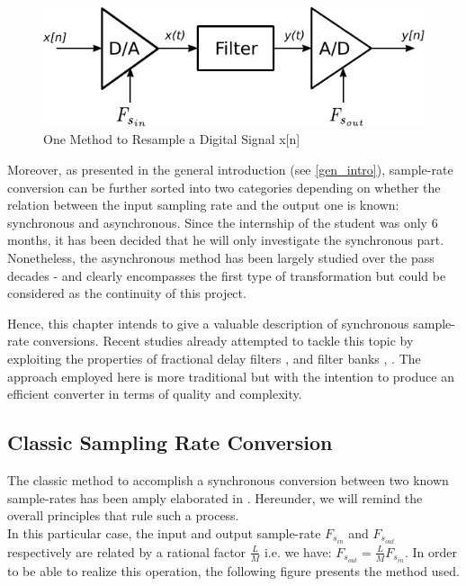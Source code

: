 \begin{figure}[th]
	\centering
	\includegraphics[scale = 1]{datoad.pdf}
	\caption{One Method to Resample a Digital Signal x[n]}\label{Figure 3.2}
\end{figure}

Moreover, as presented in the general introduction (see \ref{gen_intro}), sample-rate conversion can be further sorted into two categories depending on whether the relation between the input sampling rate and the output one is known: synchronous and asynchronous. Since the internship of the student was only 6 months, it has been decided that he will only investigate the synchronous part. Nonetheless, the asynchronous method has been largely studied over the pass decades \cite{async1}-\nocite{async2}\cite{async3} and clearly encompasses the first type of transformation but could be considered as the continuity of this project.

Hence, this chapter intends to give a valuable description of synchronous sample-rate conversions. Recent studies already attempted to tackle this topic by exploiting the properties of fractional delay filters \cite{fract1}, \cite{fract2} and filter banks \cite{filtbanks1}, \cite{filtbanks2}. The approach employed here is more traditional but with the intention to produce an efficient converter in terms of quality and complexity.


\newpage

\subsection{Classic Sampling Rate Conversion} \label{section 3.1.2}

The classic method to accomplish a synchronous conversion between two known sample-rates has been amply elaborated in \cite{Oppenheim}. Hereunder, we will remind the overall principles that rule such a process.\\

In this particular case, the input and output sample-rate $F_{s_{in}}$ and $F_{s_{out}}$ respectively are related by a rational factor $\frac{L}{M}$ i.e. we have: $F_{s_{out}}= \frac{L}{M} F_{s_{in}}$. In order to be able to realize this operation, the following figure presents the method used. 

